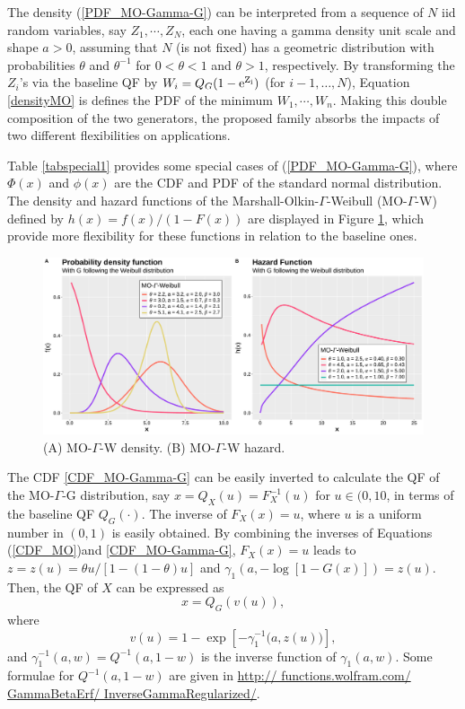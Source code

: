 \documentclass[12pt,a4paper]{article} %
\begin{document}
The density (\ref{PDF_MO-Gamma-G}) can be interpreted from a sequence of $N$ iid random variables, say $Z_1,\cdots,Z_N$,
each one having a gamma density unit scale and shape $a>0$, assuming that $N$ (is not fixed) has a geometric 
distribution with probabilities $\theta$ and $\theta^{-1}$ for $0<\theta<1$ and $\theta>1$,
respectively. By transforming the $Z_i$'s via the baseline QF by $W_i=Q_G(1-\rm{e}^{Z_i})$
(for $i-1,\ldots,N$), Equation \eqref{densityMO} is defines the PDF of the minimum $W_1,\cdots,W_n$. 
Making this double composition of the two generators, the proposed family absorbs the impacts of two different flexibilities 
on applications. 


Table \ref{tabspecial1} provides some special cases of (\ref{PDF_MO-Gamma-G}), where
$\Phi(x)$ and $\phi(x)$ are the CDF and PDF of the standard normal distribution. The density and hazard functions
of the Marshall-Olkin-$\Gamma$-Weibull (MO-$\Gamma$-W) defined by $h(x) = f(x)/(1-F(x))$ are displayed in Figure \ref{formas}, which provide
more flexibility for these functions in relation to the baseline ones.

\vspace{0.6cm}

\begin{figure}[H]
\begin{center}
\includegraphics[scale =  0.39]{pdf-hazard.pdf}
\caption{(A) MO-$\Gamma$-W density. (B) MO-$\Gamma$-W hazard.\label{formas}}
\end{center}
\end{figure}

\vspace{0.6cm}

The CDF \eqref{CDF_MO-Gamma-G} can be easily inverted to calculate the QF of the MO-$\Gamma$-G distribution,
say $x=Q_{X}(u)=F_X^{-1}(u)$ for $u \in (0,10$, in terms of the baseline QF $Q_G(\cdot)$. The inverse of
$F_{X}(x)=u$, where $u$ is a uniform number in $(0,1)$ is easily obtained. By combining the inverses
of Equations (\ref{CDF_MO})and \eqref{CDF_MO-Gamma-G}, $F_{X}(x)=u$ leads to
$z=z(u)=\theta u/[1-(1-\theta)u]$ and $\gamma_{1}\left(a, -\log[1-G(x)]\right)=z(u)$.
Then, the QF of $X$ can be expressed as
$$x=Q_G\left(v(u)\right),$$
where
$$v(u)=1-\exp\left[-\gamma_1^{-1}\big(a,z(u)\big)\right],$$
and $\gamma_1^{-1}(a,w)=Q^{-1}(a,1-w)$ is the inverse function of $\gamma_1(a,w)$. Some formulae for
$Q^{-1}(a,1-w)$ are given in \url{http:// functions.wolfram.com/ GammaBetaErf/ InverseGammaRegularized/}.
\end{document}
